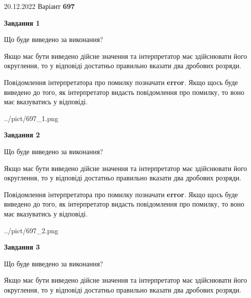 \documentclass[12pt, ukrainian]{article}
\begin{document}
{20.12.2022 Варіант \No \textbf { 697 }\par}
{
\begin {Large}

{\begin {center}\textbf{Завдання 1}\end {center}}\par
Що буде виведено за виконання? \par

Якщо має бути виведено дійсне значення та інтерпретатор має здійснювати його округлення, 
то у відповіді достатньо правильно вказати два дробових розряди.

Повідомлення інтерпретатора про помилку позначати \textbf{error}.
Якщо щось буде виведено до того, як інтерпретатор видасть повідомлення про помилку, 
то воно має вказуватись у відповіді. \par

\begin{center}
	{../pict/697_1.png}
\end{center}
\newpage

{\begin {center}\textbf{Завдання 2}\end {center}}\par
Що буде виведено за виконання? \par

Якщо має бути виведено дійсне значення та інтерпретатор має здійснювати його округлення, 
то у відповіді достатньо правильно вказати два дробових розряди.

Повідомлення інтерпретатора про помилку позначати \textbf{error}.
Якщо щось буде виведено до того, як інтерпретатор видасть повідомлення про помилку, 
то воно має вказуватись у відповіді. \par

\begin{center}
	{../pict/697_2.png}
\end{center}
\newpage

{\begin {center}\textbf{Завдання 3}\end {center}}\par
Що буде виведено за виконання? \par

Якщо має бути виведено дійсне значення та інтерпретатор має здійснювати його округлення, 
то у відповіді достатньо правильно вказати два дробових розряди.


\end{Large}}
\end{document}
